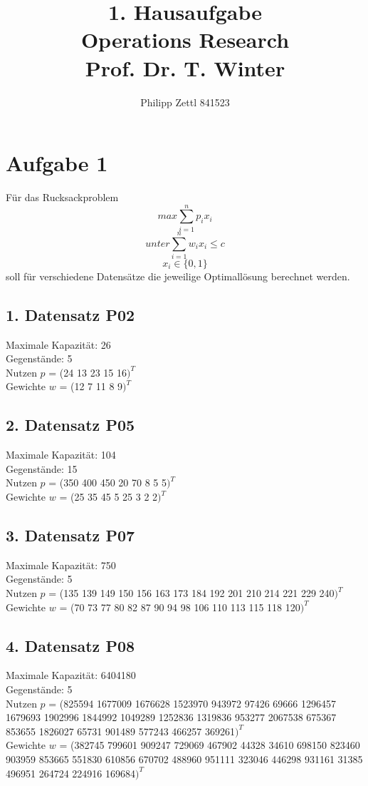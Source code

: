 \documentclass[a4paper,10pt]{article}
\title{1. Hausaufgabe\\ Operations Research\\Prof. Dr. T. Winter}
\author{Philipp Zettl 841523}
\begin{document}
\maketitle

\section*{Aufgabe 1}
Für das Rucksackproblem
 $$
 max \sum_{i=1}^{n} p_i x_i $$\newline
 $$unter \sum_{i=1}^n w_i x_i \leq c$$ \newline
 $$x_i \in \{0, 1\}$$
soll für verschiedene Datensätze die jeweilige Optimallösung berechnet werden.

\subsection*{1. Datensatz P02}
Maximale Kapazität: 26 \\
Gegenstände: 5\\
Nutzen $p$ = (24 13 23 15 16$)^T$\\
Gewichte $w$ = (12 7 11 8 9$)^T$\\
\subsection*{2. Datensatz P05}
Maximale Kapazität: 104 \\
Gegenstände: 15\\
Nutzen $p$ = (350 400 450 20 70 8 5 5$)^T$\\
Gewichte $w$ = (25 35 45 5 25 3 2 2$)^T$\\
\subsection*{3. Datensatz P07}
Maximale Kapazität: 750 \\
Gegenstände: 5\\
Nutzen $p$ = (135 139 149 150 156 163 173 184 192 201 210 214 221 229 240$)^T$\\
Gewichte $w$ = (70 73 77 80 82 87 90 94 98 106 110 113 115 118 120$)^T$\\
\subsection*{4. Datensatz P08}
Maximale Kapazität: 6404180 \\
Gegenstände: 5\\
Nutzen $p$ = (825594 1677009 1676628 1523970 943972 97426 69666 1296457 1679693
  1902996 1844992 1049289 1252836 1319836 953277 2067538 675367 853655 
  1826027 65731 901489 577243 466257 369261$)^T$\\
Gewichte $w$ = (382745 799601 909247 729069 467902 44328 34610 698150 823460 903959 
  853665 551830 610856 670702 488960 951111 323046 446298 931161 31385 
  496951 264724 224916 169684$)^T$\\
\end{document}
